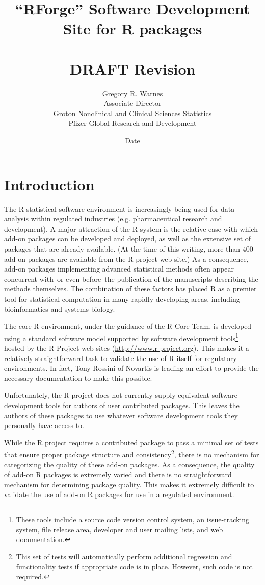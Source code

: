 \documentclass[12pt]{article}
\title{``RForge'' Software Development Site for R packages\\
	~ \\
       \textbf{DRAFT} $ $Revision$ $ }
\date{ $ $Date$ $ }
\author{Gregory R. Warnes\\
  Associate Director\\
  Groton Nonclinical and Clinical Sciences Statistics\\
  Pfizer Global Research and Development}
\begin{document}
\maketitle

\section{Introduction}

The R statistical software environment is increasingly being used
for data analysis within regulated industries (e.g. pharmaceutical
research and development).  A major attraction of the R system is
the relative ease with which add-on packages can be developed and
deployed, as well as the extensive set of packages that are
already available.  (At the time of this writing, more than 400
add-on packages are available from the R-project web site.)  As a
consequence, add-on packages implementing advanced statistical
methods often appear concurrent with--or even before--the
publication of the manuscripts describing the methods themselves.
The combination of these factors has placed R as a premier tool
for statistical computation in many rapidly developing areas,
including bioinformatics and systems biology.

The core R environment, under the guidance of the R Core Team, is
developed using a standard software model supported by software
development tools\footnote{These tools include a source code version
  control system, an issue-tracking system, file release area,
  developer and user mailing lists, and web documentation.}  hosted by
the R Project web sites (\url{http://www.r-project.org}).  This makes it a
relatively straightforward task to validate the use of R itself
for regulatory environments.  In fact, Tony Rossini of Novartis is
leading an effort to provide the necessary documentation to make this
possible.

Unfortunately, the R project does not currently supply equivalent
software development tools for authors of user contributed packages.
This leaves the authors of these packages to use whatever software
development tools they personally have access to.

While the R project requires a contributed package to pass a minimal
set of tests that ensure proper package structure and
consistency\footnote{This set of tests will automatically perform
  additional regression and functionality tests if appropriate code is
  in place.  However, such code is not required.}, there is no
mechanism for categorizing the quality of these add-on packages.  As a
consequence, the quality of add-on R packages is extremely varied and
there is no straightforward mechanism for determining package quality.
This makes it extremely difficult to validate the use of add-on R
packages for use in a regulated environment.
\end{document}
